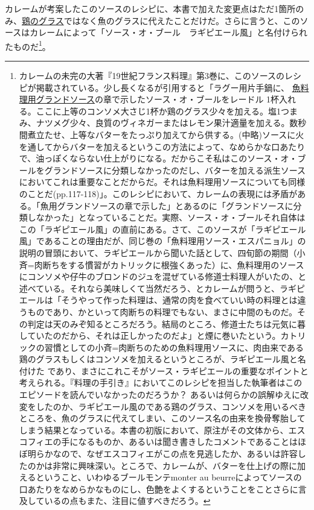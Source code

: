 \begin{recette}
カレームが考案したこのソースのレシピに、本書で加えた変更点はただ1箇所のみ、\protect\hyperlink{glace-de-volaille}{鶏のグラス}ではなく魚のグラスに代えたことだけだ。さらに言うと、このソースはカレームによって「ソース・オ・ブール　ラギピエール風」と名付けられたものだ\footnote{カレームの未完の大著『19世紀フランス料理』第3巻に、このソースのレシピが掲載されている。少し長くなるが引用すると「ラグー用片手鍋に、
  \ul{魚料理用グランドソース}の章で示したソース・オ・ブールをレードル
  1杯入れる。ここに上等のコンソメ大さじ1杯か鶏のグラス少々を加える。塩1つまみ、ナツメグ少々、良質のヴィネガーまたはレモン果汁適量を加える。数秒間煮立たせ、上等なバターをたっぷり加えてから供する。(中略)ソースに火を通してからバターを加えるというこの方法によって、なめらかな口あたりで、油っぽくならない仕上がりになる。だからこそ私はこのソース・オ・ブールをグランドソースに分類しなかったのだし、バターを加える派生ソースにおいてこれは重要なことだからだ。それは魚料理用ソースについても同様のことだ(pp.117-118)」。このレシピにおいて、カレームの表現には矛盾がある。「魚用グランドソースの章で示した」とあるのに「グランドソースに分類しなかった」となっていることだ。実際、ソース・オ・ブールそれ自体はこの「ラギピエール風」の直前にある。さて、このソースが「ラギピエール風」であることの理由だが、同じ巻の「魚料理用ソース・エスパニョル」の説明の冒頭において、ラギピエールから聞いた話として、四旬節の期間（小斉=肉断ちをする慣習がカトリックに根強くあった）に、魚料理用のソースにコンソメや仔牛のブロンドのジュを混ぜている修道士料理人がいたの、と述べている。それなら美味しくて当然だろう、とカレームが問うと、ラギピエールは「そうやって作った料理は、通常の肉を食べていい時の料理とは違うものであり、かといって肉断ちの料理でもない、まさに中間のものだ。その判定は天のみぞ知るところだろう。結局のところ、修道士たちは元気に暮していたのだから、それは正しかったのだよ」と煙に巻いたという。カトリックの習慣としての小斉=肉断ちのための魚料理用ソースに、肉由来である鶏のグラスもしくはコンソメを加えるというところが、ラギピエール風と名付けた
  であり、まさにこれこそがソース・ラギピエールの重要なポイントと考えられる。『料理の手引き』においてこのレシピを担当した執筆者はこのエピソードを読んでいなかったのだろうか？
  あるいは何らかの誤解ゆえに改変をしたのか、ラギピエール風のである鶏のグラス、コンソメを用いるべきところを、魚のグラスに代えてしまい、このソース名の由来を換骨奪胎してしまう結果となっている。本書の初版において、原注がその文体から、エスコフィエの手になるものか、あるいは聞き書きしたコメントであることはほぼ明らかなので、なぜエスコフィエがこの点を見逃したか、あるいは許容したのかは非常に興味深い。ところで、カレームが、バターを仕上げの際に加えるということ、いわゆるブールモンテmonter
  au
  beurreによってソースの口あたりをなめらかなものにし、色艶をよくするということをことさらに言及しているの点もまた、注目に値すべきだろう。}。


\end{recette}
